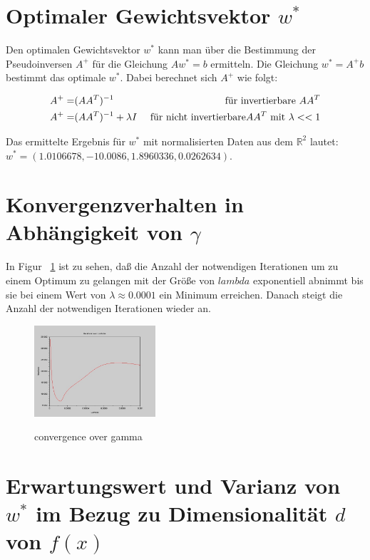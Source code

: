 \documentclass[]{report}
\begin{document}
\section{Optimaler Gewichtsvektor $w^*$}

Den optimalen Gewichtsvektor $w^*$ kann man \"uber die Bestimmung der Pseudoinversen $A^+$ f\"ur die Gleichung $Aw^*=b$ ermitteln.
Die Gleichung $w^*=A^+b$ bestimmt das optimale $w^*$. 
Dabei berechnet sich $A^+$ wie folgt:

\begin{eqnarray}
A^+ =& (AA^T)^{-1} &\textnormal{ f\"ur invertierbare } AA^T \\
A^+ =& (AA^T)^{-1} + \lambda I &\textnormal{ f\"ur nicht invertierbare} AA^T \textnormal{ mit } \lambda<<1
\end{eqnarray}

Das ermittelte Ergebnis f\"ur $w^*$ mit normalisierten Daten aus dem $\mathbb{R}^2$ lautet: $w^*=(1.0106678, - 10.0086, 1.8960336, 0.0262634)$.

\section{Konvergenzverhalten in Abh\"angigkeit von $\gamma$}

In Figur ~\ref{fig:ConvergenceOverGamma} ist zu sehen, da{\ss} die Anzahl der notwendigen Iterationen um zu einem Optimum zu gelangen mit der Gr\"o{\ss}e von $lambda$ exponentiell abnimmt bis sie bei einem Wert von $\lambda \approx 0.0001$ ein Minimum erreichen. Danach steigt die Anzahl der notwendigen Iterationen wieder an.

\begin{figure}[h]
\centering
\includegraphics[width=0.4\textwidth]{./images/ConvergenceOverGamma.jpg} \\
\caption{convergence over gamma}
\label{fig:ConvergenceOverGamma}
\end{figure}

\section{Erwartungswert und Varianz von $w^*$ im Bezug zu Dimensionalität $d$ von $f(x)$}
\end{document}
